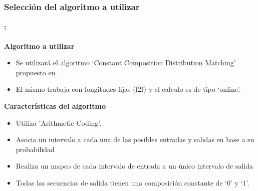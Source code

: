 \begin{frame}
  \frametitle{\textbf{Selección del algoritmo a utilizar}}
     \framesubtitle{\secname : \subsecname}
   
    \begin{block}{\centering \textbf{Algoritmo a utilizar}}
        \begin{itemize}\small
        \item Se utilizará el algoritmo `Constant Composition Distribution Matching' propuesto en \cite{schulte}.
        \item El mismo trabaja con longitudes fijas (f2f) y el calculo es de tipo `online'. 
        \end{itemize}
    \end{block}
    \vspace{-0.2cm}

    \begin{block}{\centering \textbf{Características del algoritmo}}
        \begin{itemize}\small
            \item Utiliza 'Arithmetic Coding'.
            \item Asocia un intervalo a cada una de las posibles entradas y salidas en base a su probabilidad
            \item Realiza un mapeo de cada intervalo de entrada a un único intervalo de salida
            \item Todas las secuencias de salida tienen una composición constante de `0' y `1'.
        \end{itemize}
    \end{block}
\end{frame}


